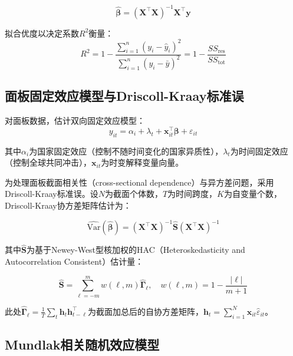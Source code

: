 \documentclass[12pt,a4paper]{ctexart}
\begin{document}
\begin{equation}
    \hat{\bm{\beta}} = (\mathbf{X}^\top \mathbf{X})^{-1} \mathbf{X}^\top \mathbf{y}
\end{equation}

拟合优度以决定系数$R^2$衡量：
\begin{equation}
    R^2 = 1 - \frac{\sum_{i=1}^{n}(y_i - \hat{y}_i)^2}{\sum_{i=1}^{n}(y_i - \bar{y})^2} = 1 - \frac{SS_{\text{res}}}{SS_{\text{tot}}}
\end{equation}

\subsection{面板固定效应模型与Driscoll-Kraay标准误}

对面板数据，估计双向固定效应模型：
\begin{equation}
\label{eq:panel-fe}
y_{it} = \alpha_i + \lambda_t + \mathbf{x}_{it}^\top \bm{\beta} + \varepsilon_{it}
\end{equation}

其中$\alpha_i$为国家固定效应（控制不随时间变化的国家异质性），$\lambda_t$为时间固定效应（控制全球共同冲击），$\mathbf{x}_{it}$为时变解释变量向量。

为处理面板截面相关性（cross-sectional dependence）与异方差问题，采用Driscoll-Kraay标准误。设$N$为截面个体数，$T$为时间跨度，$K$为自变量个数，Driscoll-Kraay协方差矩阵估计为：

\begin{equation}
    \widehat{\text{Var}}(\hat{\bm{\beta}}) = (\mathbf{X}^\top \mathbf{X})^{-1} \hat{\mathbf{S}} (\mathbf{X}^\top \mathbf{X})^{-1}
\end{equation}

其中$\hat{\mathbf{S}}$为基于Newey-West型核加权的HAC（Heteroskedasticity and Autocorrelation Consistent）估计量：

\begin{equation}
    \hat{\mathbf{S}} = \sum_{\ell = -m}^{m} w(\ell, m) \hat{\mathbf{\Gamma}}_\ell, \quad w(\ell, m) = 1 - \frac{|\ell|}{m+1}
\end{equation}

此处$\hat{\mathbf{\Gamma}}_\ell = \frac{1}{T}\sum_{t} \mathbf{h}_t \mathbf{h}_{t-\ell}^\top$为截面加总后的自协方差矩阵，$\mathbf{h}_t = \sum_{i=1}^{N} \mathbf{x}_{it}\hat{\varepsilon}_{it}$。

\subsection{Mundlak相关随机效应模型}
\end{document}
